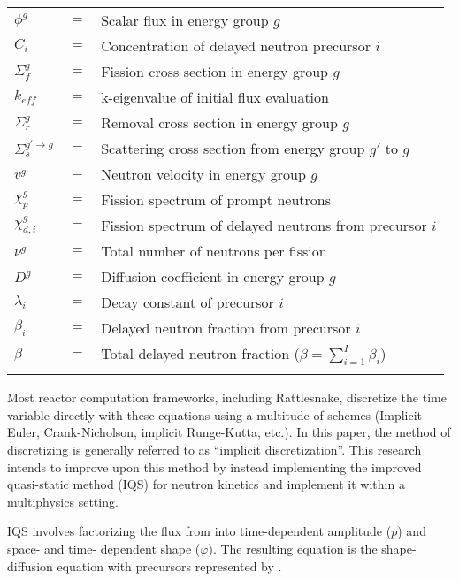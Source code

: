 \begin{longtable}{lll}
$\phi^g$   			&	$=$	&	Scalar flux in energy group $g$ \\
$C_i$					  &	$=$	&	Concentration of delayed neutron precursor $i$ \\
$\Sigma_f^{g}$	&	$=$	&	Fission cross section in energy group $g$ \\
$k_{eff}$	&	$=$	&	k-eigenvalue of initial flux evaluation \\
$\Sigma_r^{g}$	&	$=$	&	Removal cross section in energy group $g$ \\
$\Sigma_s^{g' \to g}$	&	$=$	&	Scattering cross section from energy group $g'$ to $g$ \\
$v^g$					  &	$=$	&	Neutron velocity in energy group $g$ \\
$\chi_p^g$			&	$=$	&	Fission spectrum of prompt neutrons \\
$\chi_{d,i}^g$	&	$=$	&	Fission spectrum of delayed neutrons from precursor $i$ \\
$\nu^g$					&	$=$	&	Total number of neutrons per fission \\
$D^g$					  &	$=$	&	Diffusion coefficient in energy group $g$\\
$\lambda_i$			&	$=$	&	Decay constant of precursor $i$ \\
$\beta_i$				&	$=$	&	Delayed neutron fraction  from precursor $i$ \\
$\beta$			 	  &	$=$	&	Total delayed neutron fraction ($\beta = \sum_{i=1}^I \beta_{i}$) \\
  & & 
\end{longtable}

Most reactor computation frameworks, including Rattlesnake, discretize the time variable directly with these equations using a multitude of schemes (Implicit Euler, Crank-Nicholson, implicit Runge-Kutta, etc.).  In this paper, the method of discretizing  is generally referred to as ``implicit discretization''.  This research intends to improve upon this method by instead implementing the improved quasi-static method (IQS) for neutron kinetics and
implement it within a multiphysics setting.

IQS involves factorizing the flux from  into time-dependent amplitude ($p$) and space- and time- dependent shape ($\varphi$).  The resulting equation is the shape-diffusion equation with precursors represented by .

